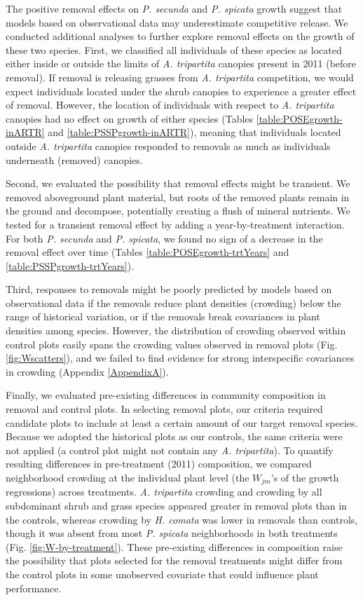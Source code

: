 \documentclass[11pt]{article}
\begin{document}
\begin{doublespacing}
The positive removal effects on \textit{P. secunda}  and \textit{P. spicata} growth suggest that models based on observational data may underestimate competitive release. We conducted additional analyses to further explore removal effects on the growth of these two species. First, we classified all individuals of these species as located either inside or outside the limits of \textit{A. tripartita} canopies present in 2011 (before removal). If removal is releasing grasses from \textit{A. tripartita} competition, we would expect individuals located under the shrub canopies to experience a greater effect of removal. However, the location of individuals with respect to \textit{A. tripartita} canopies had no effect on growth of either species (Tables \ref{table:POSEgrowth-inARTR} and \ref{table:PSSPgrowth-inARTR}), meaning that individuals located outside \textit{A. tripartita} canopies responded to removals as much as individuals underneath (removed) canopies. 

Second, we evaluated the possibility that removal effects might be transient. We removed aboveground plant material, but roots of the removed plants remain in the ground and decompose, potentially creating a flush of mineral nutrients. We tested for a transient removal effect by adding a year-by-treatment interaction. For both  \textit{P. secunda}  and \textit{P. spicata}, we found no sign of a decrease in the removal effect over time (Tables \ref{table:POSEgrowth-trtYears} and \ref{table:PSSPgrowth-trtYears}).

Third, responses to removals might be poorly predicted by models based on observational data if the removals reduce plant densities (crowding) below the range of historical variation, or if the removals break covariances in plant densities among species. However, the distribution of crowding observed within control plots easily spans the crowding values observed in removal plots (Fig. \ref{fig:Wscatters}), and we failed to find evidence for strong interspecific covariances in crowding (Appendix \ref{AppendixA}).

Finally, we evaluated pre-existing differences in community composition in removal and control plots. In selecting removal plots, our criteria required candidate plots to include at least a certain amount of our target removal species. Because we adopted the historical plots as our controls, the same criteria were not applied (a control plot might not contain any \textit{A. tripartita}). To quantify resulting differences in pre-treatment (2011) composition, we compared neighborhood crowding at the individual plant level (the $W_{jm}$'s of the growth regressions) across treatments. \textit{A. tripartita} crowding and crowding by all subdominant shrub and grass species appeared greater in removal plots than in the controls, whereas crowding by \textit{H. comata} was lower in removals than controls, though it was absent from most \textit{P. spicata} neighborhoods in both treatments (Fig. \ref{fig:W-by-treatment}). These pre-existing differences in composition raise the possibility that plots selected for the removal treatments might differ from the control plots in some unobserved covariate that could influence plant performance.


\end{doublespacing}
\end{document}
